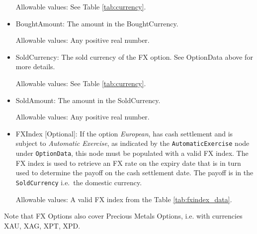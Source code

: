 \begin{itemize}
Allowable values: See Table \ref{tab:currency}.

\item BoughtAmount: The amount in the BoughtCurrency.

Allowable values: Any positive real number.

\item SoldCurrency: The sold currency of the FX option. See OptionData above for more details.

Allowable values: See Table \ref{tab:currency}.

\item SoldAmount: The amount in the SoldCurrency.

Allowable values: Any positive real number.

\item FXIndex [Optional]: If the option \textit{European}, has cash settlement and is subject to \textit{Automatic Exercise}, as indicated by the \lstinline!AutomaticExercise! node under \lstinline!OptionData!, this node must be populated with a valid FX index. The FX index is used to retrieve an FX rate on the expiry date that is in turn used to determine the payoff on the cash settlement date. The payoff is in the \lstinline!SoldCurrency! i.e.\ the domestic currency.

Allowable values: A valid FX index from the Table \ref{tab:fxindex_data}.

\end{itemize}

Note that FX Options also cover Precious Metals Options, i.e. with currencies XAU, XAG, XPT, XPD.